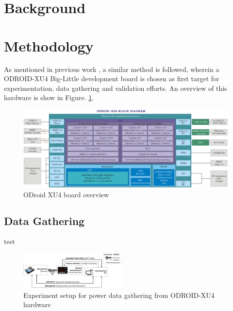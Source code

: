 \documentclass[conference]{IEEEtran}
\begin{document}
\section{Background}


\section{Methodology}
    \par As mentioned in previous work \cite{Reddy2017EmpiricalCP}, a similar method is followed, wherein a ODROID-XU4\cite{odroid-xu4} Big-Little development board is chosen as first target for experimentation, data gathering and validation efforts. An overview of this hardware is show in Figure. \ref{fig-odroid-hwoverview}. 

    \begin{figure}[b]
        \includegraphics{rsrc/201506191222574523.png}
        \caption{ODroid XU4 board overview}
        \label{fig-odroid-hwoverview}
    \end{figure}
    
    \subsection{Data Gathering}
        \par test


        \begin{figure}[t]
            \centering
            \includegraphics[width=0.48\textwidth]{rsrc/Experiment-setup.drawio.png}
            \caption{Experiment setup for power data gathering from ODROID-XU4\cite{odroid-xu4} hardware}
            \label{fig-Experiment-setup}
        \end{figure}
\end{document}
